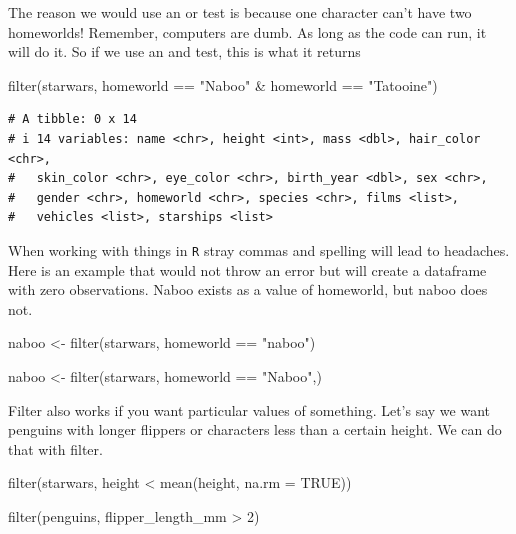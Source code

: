 \documentclass[
  letterpaper,
  DIV=11,
  numbers=noendperiod,
  oneside]{scrreprt}
\newenvironment{Shaded}{\begin{snugshade}}{\end{snugshade}}
\newcommand{\AttributeTok}[1]{\textcolor[rgb]{0.40,0.45,0.13}{#1}}
\newcommand{\ConstantTok}[1]{\textcolor[rgb]{0.56,0.35,0.01}{#1}}
\newcommand{\DecValTok}[1]{\textcolor[rgb]{0.68,0.00,0.00}{#1}}
\newcommand{\FunctionTok}[1]{\textcolor[rgb]{0.28,0.35,0.67}{#1}}
\newcommand{\NormalTok}[1]{\textcolor[rgb]{0.00,0.23,0.31}{#1}}
\newcommand{\OtherTok}[1]{\textcolor[rgb]{0.00,0.23,0.31}{#1}}
\newcommand{\SpecialCharTok}[1]{\textcolor[rgb]{0.37,0.37,0.37}{#1}}
\newcommand{\StringTok}[1]{\textcolor[rgb]{0.13,0.47,0.30}{#1}}
\begin{document}
The reason we would use an or test is because one character can't have
two homeworlds! Remember, computers are dumb. As long as the code can
run, it will do it. So if we use an and test, this is what it returns

\begin{Shaded}
\begin{Highlighting}[]
\FunctionTok{filter}\NormalTok{(starwars, homeworld }\SpecialCharTok{==} \StringTok{"Naboo"} \SpecialCharTok{\&}\NormalTok{ homeworld }\SpecialCharTok{==} \StringTok{"Tatooine"}\NormalTok{)}
\end{Highlighting}
\end{Shaded}

\begin{verbatim}
# A tibble: 0 x 14
# i 14 variables: name <chr>, height <int>, mass <dbl>, hair_color <chr>,
#   skin_color <chr>, eye_color <chr>, birth_year <dbl>, sex <chr>,
#   gender <chr>, homeworld <chr>, species <chr>, films <list>,
#   vehicles <list>, starships <list>
\end{verbatim}

When working with things in \texttt{R} stray commas and spelling will
lead to headaches. Here is an example that would not throw an error but
will create a dataframe with zero observations. Naboo exists as a value
of homeworld, but naboo does not.

\begin{Shaded}
\begin{Highlighting}[]
\NormalTok{ naboo }\OtherTok{\textless{}{-}} \FunctionTok{filter}\NormalTok{(starwars, homeworld }\SpecialCharTok{==} \StringTok{"naboo"}\NormalTok{)}

\NormalTok{naboo }\OtherTok{\textless{}{-}} \FunctionTok{filter}\NormalTok{(starwars, homeworld }\SpecialCharTok{==} \StringTok{"Naboo"}\NormalTok{,)}
\end{Highlighting}
\end{Shaded}

Filter also works if you want particular values of something. Let's say
we want penguins with longer flippers or characters less than a certain
height. We can do that with filter.

\begin{Shaded}
\begin{Highlighting}[]
\FunctionTok{filter}\NormalTok{(starwars, height }\SpecialCharTok{\textless{}} \FunctionTok{mean}\NormalTok{(height, }\AttributeTok{na.rm =} \ConstantTok{TRUE}\NormalTok{))}

\FunctionTok{filter}\NormalTok{(penguins, flipper\_length\_mm }\SpecialCharTok{\textgreater{}} \DecValTok{2}\NormalTok{)}
\end{Highlighting}
\end{Shaded}
\end{document}
